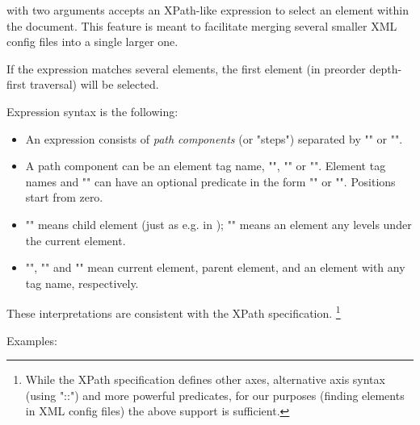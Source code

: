  with two arguments accepts an XPath-like expression
to select an element within the document. This feature is meant to
facilitate merging several smaller XML config files into a single larger
one.

If the expression matches several elements, the first element
(in preorder depth-first traversal) will be selected.

Expression syntax is the following:

\begin{itemize}
  \item An expression consists of \textit{path components} (or "steps")
        separated by "\ttt{/}" or "\ttt{//}".
  \item A path component can be an element tag name, "\ttt{*}", ""
        or "". Element tag names and "\ttt{*}" can have an optional predicate
        in the form "\ttt{[position]}" or "\ttt{[@attribute='value']}".
        Positions start from zero.
  \item "\ttt{/}" means child element (just as e.g. in );
        "\ttt{//}" means an element any levels under the current element.
  \item "", "" and "\ttt{*}" mean current element,
        parent element, and an element with any tag name, respectively.
\end{itemize}

These interpretations are consistent with the XPath specification.
  \footnote{While the XPath specification defines other axes, alternative
  axis syntax (using "::") and more powerful predicates, for our purposes
  (finding elements in XML config files) the above support is sufficient.}

Examples:


